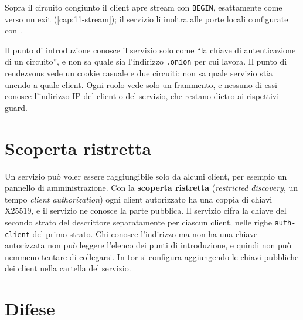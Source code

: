 Sopra il circuito congiunto il client apre stream con \texttt{BEGIN}, esattamente come verso un exit (\cref{cap:11-stream}); il servizio li inoltra alle porte locali configurate con .

\begin{approfondimento}
Il punto di introduzione conosce il servizio solo come \enquote{la chiave di autenticazione di un circuito}, e non sa quale sia l'indirizzo \texttt{.onion} per cui lavora. Il punto di rendezvous vede un cookie casuale e due circuiti: non sa quale servizio stia unendo a quale client. Ogni ruolo vede solo un frammento, e nessuno di essi conosce l'indirizzo IP del client o del servizio, che restano dietro ai rispettivi guard.
\end{approfondimento}

\section{Scoperta ristretta}\label{sec:os-ristretta}

Un servizio può voler essere raggiungibile solo da alcuni client, per esempio un pannello di amministrazione. Con la \textbf{scoperta ristretta} (\emph{restricted discovery}, un tempo \emph{client authorization}) ogni client autorizzato ha una coppia di chiavi X25519, e il servizio ne conosce la parte pubblica. Il servizio cifra la chiave del secondo strato del descrittore separatamente per ciascun client, nelle righe \texttt{auth-client} del primo strato. Chi conosce l'indirizzo ma non ha una chiave autorizzata non può leggere l'elenco dei punti di introduzione, e quindi non può nemmeno tentare di collegarsi. In tor si configura aggiungendo le chiavi pubbliche dei client nella cartella  del servizio.

\section{Difese}\label{sec:os-difese}


